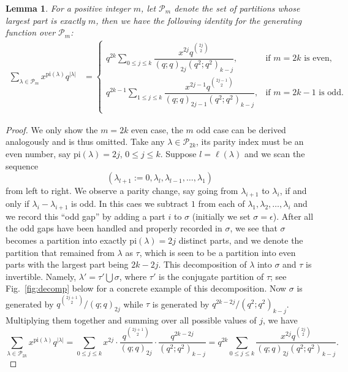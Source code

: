 \documentclass[11pt,reqno]{amsart}
\numberwithin{equation}{section}
\theoremstyle{plain}
\newtheorem{lemma}[theorem]{Lemma}
\theoremstyle{definition}
\theoremstyle{named}
\newcommand{\abs}[1]{\left|#1\right|}
\def\cP{\mathcal{P}}
\def\la{\lambda}
\def\pai{\mathrm{pi}}
\begin{document}
\begin{lemma}\label{lem:gf-alt}
For a positive integer $m$, let $\cP_m$ denote the set of partitions whose largest part is exactly $m$, then we have the following identity for the generating function over $\cP_m$:
\begin{align}
\label{id:gf-alt}
\sum_{\la\in\cP_m}x^{\pai(\la)}q^{\abs{\la}} &=
\begin{cases}
q^{2k} \sum\limits_{0\le j\le k}\dfrac{x^{2j}q^{\binom{2j}{2}}}{(q;q)_{2j}(q^2;q^2)_{k-j}}, & \text{if $m=2k$ is even,}\\
q^{2k-1} \sum\limits_{1\le j\le k}\dfrac{x^{2j-1}q^{\binom{2j-1}{2}}}{(q;q)_{2j-1}(q^2;q^2)_{k-j}}, & \text{if $m=2k-1$ is odd.}\\
\end{cases}
\end{align}
\end{lemma}
\begin{proof}
We only show the $m=2k$ even case, the $m$ odd case can be derived analogously and is thus omitted. Take any $\la\in\cP_{2k}$, its parity index must be an even number, say $\pai(\la)=2j$, $0\le j\le k$. Suppose $l=\ell(\la)$ and we scan the sequence 
$$(\la_{l+1}:=0,\la_l,\la_{l-1},\ldots,\la_1)$$ 
from left to right. We observe a parity change, say going from $\la_{i+1}$ to $\la_{i}$, if and only if $\la_{i}-\la_{i+1}$ is odd. In this caes we subtract $1$ from each of $\la_1,\la_2,\ldots,\la_{i}$ and we record this ``odd gap'' by adding a part $i$ to $\sigma$ (initially we set $\sigma=\epsilon$). After all the odd gaps have been handled and properly recorded in $\sigma$, we see that $\sigma$ becomes a partition into exactly $\pai(\la)=2j$ distinct parts, and we denote the partition that remained from $\la$ as $\tau$, which is seen to be a partition into even parts with the largest part being $2k-2j$. This decomposition of $\la$ into $\sigma$ and $\tau$ is invertible. Namely, $\la'=\tau'\bigcup\sigma$, where $\tau'$ is the conjugate partition of $\tau$; see Fig.~\ref{fig:decomp} below for a concrete example of this decomposition. Now $\sigma$ is generated by $q^{\binom{2j+1}{2}}/(q;q)_{2j}$ while $\tau$ is generated by $q^{2k-2j}/(q^2;q^2)_{k-j}$. Multiplying them together and summing over all possible values of $j$, we have
$$\sum_{\la\in\cP_{2k}}x^{\pai(\la)}q^{\abs{\la}}=\sum_{0\le j\le k}x^{2j}\cdot \frac{q^{\binom{2j+1}{2}}}{(q;q)_{2j}}\cdot \frac{q^{2k-2j}}{(q^2;q^2)_{k-j}}=q^{2k}\sum_{0\le j\le k}\frac{x^{2j}q^{\binom{2j}{2}}}{(q;q)_{2j}(q^2;q^2)_{k-j}}.$$
\end{proof}
\end{document}
